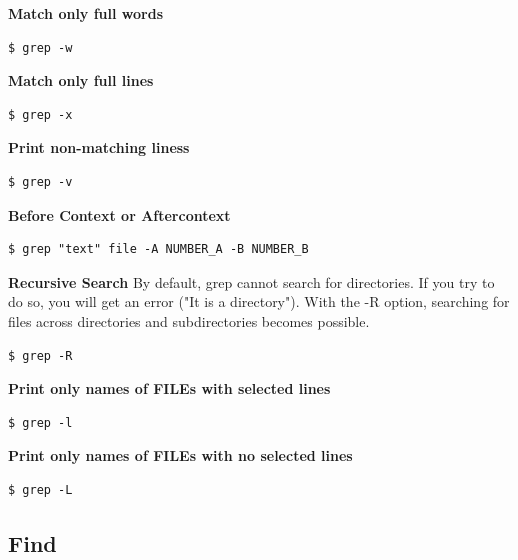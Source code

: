 \documentclass{article}
\newenvironment{codetemplate}[1][]{%
  \mybasecolorbox[#1]
  \itshape
}{%
  \endmybasecolorbox
}
\begin{document}
\textbf{Match only full words}
\begin{codetemplate}{}
\begin{verbatim}
$ grep -w
\end{verbatim}
\end{codetemplate}

\textbf{Match only full lines}
\begin{codetemplate}{}
\begin{verbatim}
$ grep -x
\end{verbatim}
\end{codetemplate}

\textbf{Print non-matching liness}
\begin{codetemplate}{}
\begin{verbatim}
$ grep -v
\end{verbatim}
\end{codetemplate}

\textbf{Before Context or Aftercontext}
\begin{codetemplate}{}
\begin{verbatim}
$ grep "text" file -A NUMBER_A -B NUMBER_B
\end{verbatim}
\end{codetemplate}


\textbf{Recursive Search}
By default, grep cannot search for directories. If you try to do so, you will get an error ("It is a directory"). With the -R option, searching for files across directories and subdirectories becomes possible.
\begin{codetemplate}{}
\begin{verbatim}
$ grep -R
\end{verbatim}
\end{codetemplate}

\textbf{Print only names of FILEs with selected lines}
\begin{codetemplate}{}
\begin{verbatim}
$ grep -l
\end{verbatim}
\end{codetemplate}

\textbf{Print only names of FILEs with no selected lines}
\begin{codetemplate}{}
\begin{verbatim}
$ grep -L
\end{verbatim}
\end{codetemplate}


\subsection{Find}
\end{document}
